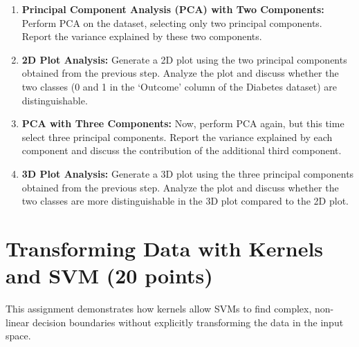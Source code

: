 \documentclass[12pt, xcolor=dvipsnames,svgnames,x11names]{article}
\begin{document}
\begin{enumerate}
    \item \textbf{Principal Component Analysis (PCA) with Two Components: }Perform PCA on the dataset, selecting only two principal components. Report the variance explained by these two components.
    \item \textbf{2D Plot Analysis:} Generate a 2D plot using the two principal components obtained from the previous step. Analyze the plot and discuss whether the two classes (0 and 1 in the ‘Outcome’ column of the Diabetes dataset) are distinguishable.
    \item \textbf{PCA with Three Components:} Now, perform PCA again, but this time select three principal components. Report the variance explained by each component and discuss the contribution of the additional third component.
    \item \textbf{3D Plot Analysis:} Generate a 3D plot using the three principal components obtained from the previous step. Analyze the plot and discuss whether the two classes are more distinguishable in the 3D plot compared to the 2D plot.
\end{enumerate}


\section{Transforming Data with Kernels and SVM \textbf{(20 points)}}

This assignment demonstrates how kernels allow SVMs to find complex, non-linear decision boundaries without explicitly transforming the data in the input space.
\end{document}
